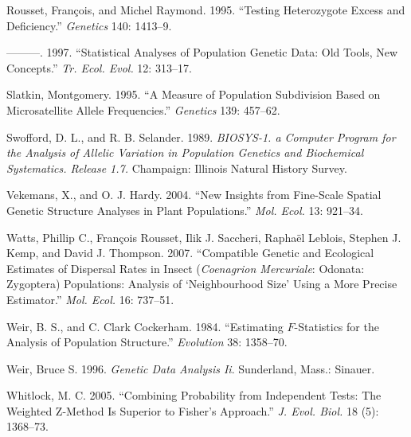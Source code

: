 \documentclass[12pt,]{book}
\theoremstyle{definition}
\theoremstyle{definition}
\theoremstyle{definition}
\theoremstyle{remark}
\begin{document}
\hypertarget{ref-RoussetR95}{}
Rousset, François, and Michel Raymond. 1995. ``Testing Heterozygote
Excess and Deficiency.'' \emph{Genetics} 140: 1413--9.

\hypertarget{ref-RoussetR97}{}
---------. 1997. ``Statistical Analyses of Population Genetic Data: Old
Tools, New Concepts.'' \emph{Tr. Ecol. Evol.} 12: 313--17.

\hypertarget{ref-Slatkin95}{}
Slatkin, Montgomery. 1995. ``A Measure of Population Subdivision Based
on Microsatellite Allele Frequencies.'' \emph{Genetics} 139: 457--62.

\hypertarget{ref-SwoffordS89}{}
Swofford, D. L., and R. B. Selander. 1989. \emph{BIOSYS-1. a Computer
Program for the Analysis of Allelic Variation in Population Genetics and
Biochemical Systematics. Release 1.7.} Champaign: Illinois Natural
History Survey.

\hypertarget{ref-VekemansH04}{}
Vekemans, X., and O. J. Hardy. 2004. ``New Insights from Fine-Scale
Spatial Genetic Structure Analyses in Plant Populations.'' \emph{Mol.
Ecol.} 13: 921--34.

\hypertarget{ref-WattsX07}{}
Watts, Phillip C., François Rousset, Ilik J. Saccheri, Raphaël Leblois,
Stephen J. Kemp, and David J. Thompson. 2007. ``Compatible Genetic and
Ecological Estimates of Dispersal Rates in Insect (\emph{Coenagrion
Mercuriale}: Odonata: Zygoptera) Populations: Analysis of `Neighbourhood
Size' Using a More Precise Estimator.'' \emph{Mol. Ecol.} 16: 737--51.

\hypertarget{ref-WeirC84}{}
Weir, B. S., and C. Clark Cockerham. 1984. ``Estimating \(F\)-Statistics
for the Analysis of Population Structure.'' \emph{Evolution} 38:
1358--70.

\hypertarget{ref-WeirbkII}{}
Weir, Bruce S. 1996. \emph{Genetic Data Analysis Ii}. Sunderland, Mass.:
Sinauer.

\hypertarget{ref-Whitlock05}{}
Whitlock, M. C. 2005. ``Combining Probability from Independent Tests:
The Weighted Z-Method Is Superior to Fisher's Approach.'' \emph{J. Evol.
Biol.} 18 (5): 1368--73.
\end{document}
